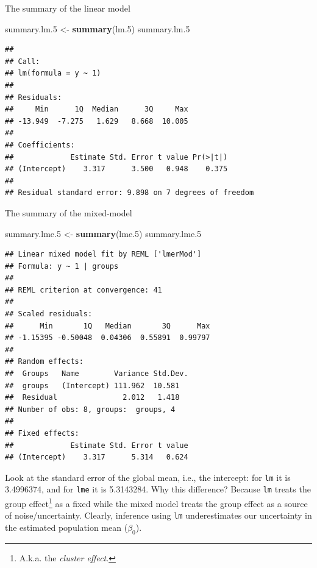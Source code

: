 \documentclass[]{book}
\newenvironment{Shaded}{\begin{snugshade}}{\end{snugshade}}
\newcommand{\FloatTok}[1]{\textcolor[rgb]{0.00,0.00,0.81}{#1}}
\newcommand{\KeywordTok}[1]{\textcolor[rgb]{0.13,0.29,0.53}{\textbf{#1}}}
\newcommand{\NormalTok}[1]{#1}
\newcommand{\StringTok}[1]{\textcolor[rgb]{0.31,0.60,0.02}{#1}}
\theoremstyle{definition}
\theoremstyle{definition}
\theoremstyle{definition}
\theoremstyle{remark}
\begin{document}
The summary of the linear model

\begin{Shaded}
\begin{Highlighting}[]
\NormalTok{summary.lm}\FloatTok{.5}\NormalTok{ <-}\StringTok{ }\KeywordTok{summary}\NormalTok{(lm}\FloatTok{.5}\NormalTok{)}
\NormalTok{summary.lm}\FloatTok{.5}
\end{Highlighting}
\end{Shaded}

\begin{verbatim}
## 
## Call:
## lm(formula = y ~ 1)
## 
## Residuals:
##     Min      1Q  Median      3Q     Max 
## -13.949  -7.275   1.629   8.668  10.005 
## 
## Coefficients:
##             Estimate Std. Error t value Pr(>|t|)
## (Intercept)    3.317      3.500   0.948    0.375
## 
## Residual standard error: 9.898 on 7 degrees of freedom
\end{verbatim}

The summary of the mixed-model

\begin{Shaded}
\begin{Highlighting}[]
\NormalTok{summary.lme}\FloatTok{.5}\NormalTok{ <-}\StringTok{ }\KeywordTok{summary}\NormalTok{(lme}\FloatTok{.5}\NormalTok{)}
\NormalTok{summary.lme}\FloatTok{.5}
\end{Highlighting}
\end{Shaded}

\begin{verbatim}
## Linear mixed model fit by REML ['lmerMod']
## Formula: y ~ 1 | groups
## 
## REML criterion at convergence: 41
## 
## Scaled residuals: 
##      Min       1Q   Median       3Q      Max 
## -1.15395 -0.50048  0.04306  0.55891  0.99797 
## 
## Random effects:
##  Groups   Name        Variance Std.Dev.
##  groups   (Intercept) 111.962  10.581  
##  Residual               2.012   1.418  
## Number of obs: 8, groups:  groups, 4
## 
## Fixed effects:
##             Estimate Std. Error t value
## (Intercept)    3.317      5.314   0.624
\end{verbatim}

Look at the standard error of the global mean, i.e., the intercept:
for \texttt{lm} it is 3.4996374, and for \texttt{lme} it is 5.3143284.
Why this difference?
Because \texttt{lm} treats the group effect\footnote{A.k.a. the \emph{cluster effect}.} as a fixed while the mixed model treats the group effect as a source of noise/uncertainty.
Clearly, inference using \texttt{lm} underestimates our uncertainty in the estimated population mean (\(\beta_0\)).
\end{document}
